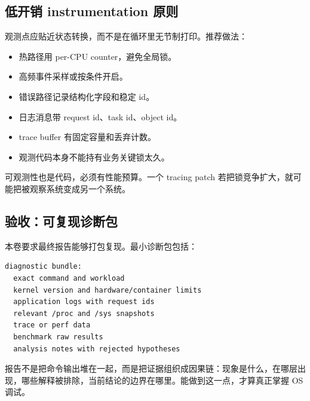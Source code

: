 \subsection{低开销 instrumentation 原则}

观测点应贴近状态转换，而不是在循环里无节制打印。推荐做法：

\begin{itemize}
\tightlist
\item 热路径用 per-CPU counter，避免全局锁。
\item 高频事件采样或按条件开启。
\item 错误路径记录结构化字段和稳定 id。
\item 日志消息带 request id、task id、object id。
\item trace buffer 有固定容量和丢弃计数。
\item 观测代码本身不能持有业务关键锁太久。
\end{itemize}

可观测性也是代码，必须有性能预算。一个 tracing patch 若把锁竞争扩大，就可能把被观察系统变成另一个系统。

\subsection{验收：可复现诊断包}

本卷要求最终报告能够打包复现。最小诊断包包括：

\begin{lstlisting}
diagnostic bundle:
  exact command and workload
  kernel version and hardware/container limits
  application logs with request ids
  relevant /proc and /sys snapshots
  trace or perf data
  benchmark raw results
  analysis notes with rejected hypotheses
\end{lstlisting}

报告不是把命令输出堆在一起，而是把证据组织成因果链：现象是什么，在哪层出现，哪些解释被排除，当前结论的边界在哪里。能做到这一点，才算真正掌握 OS 调试。

